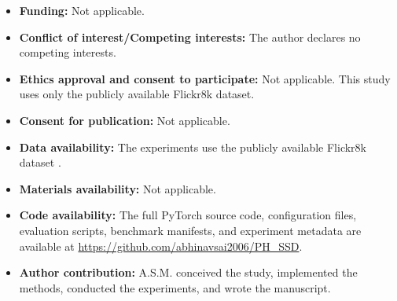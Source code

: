 \documentclass[pdflatex,sn-mathphys-num]{sn-jnl}%
\begin{document}
\begin{itemize}
\item \textbf{Funding:} Not applicable. %
\item \textbf{Conflict of interest/Competing interests:} The author declares no competing interests. %
\item \textbf{Ethics approval and consent to participate:} Not applicable. This study uses only the publicly available Flickr8k dataset.
\item \textbf{Consent for publication:} Not applicable.
\item \textbf{Data availability:} The experiments use the publicly available Flickr8k dataset \cite{hodosh2013framing}.
\item \textbf{Materials availability:} Not applicable.
\item \textbf{Code availability:} The full PyTorch source code, configuration files, evaluation scripts, benchmark manifests, and experiment metadata are available at \url{https://github.com/abhinavsai2006/PH_SSD}.
\item \textbf{Author contribution:} A.S.M. conceived the study, implemented the methods, conducted the experiments, and wrote the manuscript. %
\end{itemize}


\end{document}
